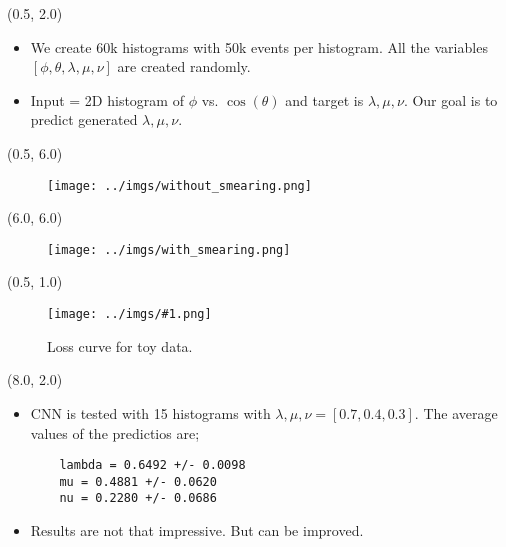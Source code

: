\documentclass[10pt, xcolor={dvipsnames}, aspectratio = 169, sans,mathserif]{beamer}
\newcommand{\leftpic}[2]
{
\begin{textblock}{7.0}(0.5, 1.0)
\begin{figure}
    \centering
    \texttt{[image: ../imgs/\#1.png]}
    \caption{#2}
\end{figure}
\end{textblock}
}
\begin{document}
\begin{frame}[fragile]
\begin{textblock}{15.0}(0.5, 2.0)
\begin{itemize}

    \item We create 60k histograms with 50k events per histogram. All the variables $[\phi, \theta, \lambda, \mu, \nu]$ are created randomly.

    \item Input = 2D histogram of $\phi$ vs. $\cos(\theta)$ and target is $\lambda, \mu, \nu$. Our goal is to predict generated $\lambda, \mu, \nu$.
\end{itemize}
\end{textblock}

\begin{textblock}{5.0}(0.5, 6.0)
\begin{figure}
    \centering
    \texttt{[image: ../imgs/without\_smearing.png]}
\end{figure}
\end{textblock}

\begin{textblock}{5.0}(6.0, 6.0)
\begin{figure}
    \centering
    \texttt{[image: ../imgs/with\_smearing.png]}
\end{figure}
\end{textblock}

\end{frame}


\begin{frame}[fragile]

\leftpic{loss_toy}{Loss curve for toy data.}

\begin{textblock}{7.0}(8.0, 2.0)
\begin{itemize}

    \item CNN is tested with 15 histograms with $\lambda, \mu, \nu = [0.7, 0.4, 0.3]$. The average values of the predictios are;

    \begin{verbatim}
    lambda = 0.6492 +/- 0.0098
    mu = 0.4881 +/- 0.0620
    nu = 0.2280 +/- 0.0686
    \end{verbatim}

    \item Results are not that impressive. But can be improved.

\end{itemize}
\end{textblock}

\end{frame}
\end{document}
